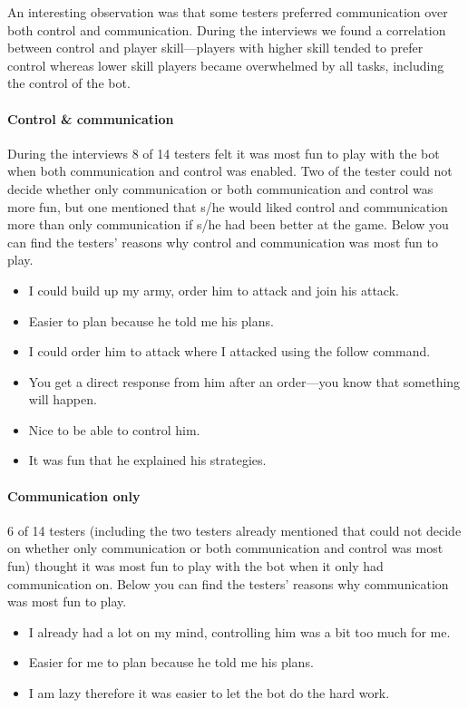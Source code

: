An interesting observation was that some testers preferred communication over both control and
communication. During the interviews we found a correlation between control and player skill—players
with higher skill tended to prefer control whereas lower skill players became overwhelmed by all
tasks, including the control of the bot.





\paragraph{Control \& communication}
During the interviews 8 of 14 testers felt it was most fun to play with the bot when both
communication and control was enabled. Two of the tester could not decide whether only communication or both
communication and control was more fun, but one mentioned that s/he would liked control and
communication more than only communication if s/he had been better at the game. Below you can find
the testers' reasons why control and communication was most fun to play.
\begin{itemize}
	\item I could build up my army, order him to attack and join his attack.
	\item Easier to plan because he told me his plans.
	\item I could order him to attack where I attacked using the follow command.
	\item You get a direct response from him after an order—you know that something will happen.
	\item Nice to be able to control him.
	\item It was fun that he explained his strategies.
\end{itemize}

\paragraph{Communication only}
6 of 14 testers (including the two testers already mentioned that could not decide on whether only
communication or both communication and control was most fun) thought it was most fun to play with
the bot when it only had communication on. Below you can find the testers' reasons why communication
was most fun to play.
\begin{itemize}
	\item I already had a lot on my mind, controlling him was a bit too much for me.	
	\item Easier for me to plan because he told me his plans.
	\item I am lazy therefore it was easier to let the bot do the hard work.
\end{itemize}

